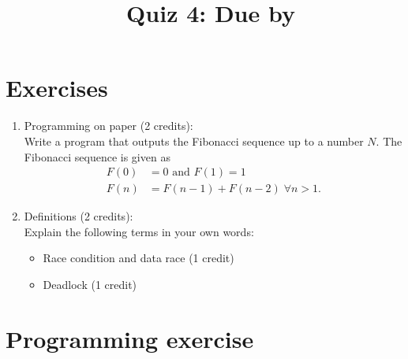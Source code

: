 \documentclass[11pt]{article}
\begin{document}
\title{\coursename~Quiz 4: Due by }
\date{}
\maketitle

\medskip


\section*{Exercises}

\begin{enumerate}
\item Programming on paper (2 credits): \\
Write a program that outputs the Fibonacci sequence up to a number $N$. The Fibonacci sequence is given as
\begin{align*}
F(0) &= 0 \text{ and } F(1) = 1  \\
F(n) &= F(n-1) + F(n-2) \; \forall n > 1\text{.}
\end{align*} 

\item Definitions (2 credits): \\
Explain the following terms in your own words:
\begin{itemize}
\item Race condition and data race (1 credit)
\item Deadlock (1 credit)
\end{itemize}


\end{enumerate}

\section*{Programming exercise}
\end{document}
